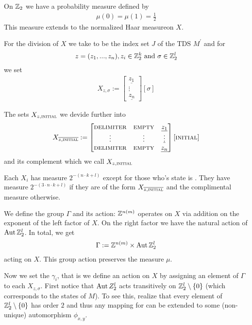On $\mathbb{Z}_2$ we have a probability measure defined by
\begin{align*}
	\mu(0) = \mu(1) = \frac12
\end{align*}
This measure extends to the normalized Haar measure\footnotemark on $X$.

For the division of $X$ we take  to be the index set $J$ of the TDS $M^\prime$ and for
\begin{align*}
	z = (z_1,...,z_n), z_i \in \mathbb{Z}_2^k ~\text{and}~\sigma \in \mathbb{Z}_2^l
\end{align*}
we set
\begin{align*}
	X_{z,\sigma} :=
	\begin{bmatrix}
		\underline{z_{1}} \\
		\vdots \\
		\underline{z_{n}}
	\end{bmatrix} [ \sigma ]
\end{align*}

The sets $X_{z,\text{\scshape{initial}}}$ we devide further into
\begin{align*}
	X_{\overline{z,\text{\scshape{initial}}}} :=
	\begin{bmatrix}
		\text{\scshape{delimiter}} & \text{\scshape{empty}} & \underline{z_1} \\
		\vdots & \vdots & \underline\vdots \\
		\text{\scshape{delimiter}} & \text{\scshape{empty}} & \underline{z_n} \\
	\end{bmatrix} [ \text{\scshape{initial}} ]
\end{align*}
and its complement which we call $X_{z,\text{\scshape{initial}}}$

\begin{Remark}
	Each $X_i$ has measure $2^{-(n \cdot k+l)}$ except for those who's state is \INI.
	They have measure $2^{-(3 \cdot n \cdot k+l)}$ if they are of the form $X_{\overline{z,\text{\scshape{initial}}}}$ and the complimental measure otherwise.
\end{Remark}

We define the group $\Gamma$ and its action:
$\mathbb{Z}^{n(m)}$ operates on $X$ via addition on the exponent of the left factor of $X$.
On the right factor we have the natural action of $\operatorname{Aut} \mathbb{Z}_2^l$.
In total, we get
\begin{align*}
	\Gamma := \mathbb{Z}^{n(m)} \times \operatorname{Aut} \mathbb{Z}_2^l
\end{align*}
acting on $X$.
This group action preserves the measure $\mu$.

Now we set the $\gamma_i$, that is we define an action on $X$ by assigning an element of $\Gamma$ to each $X_{z,\sigma}$.
First notice that
$\operatorname{Aut} Z_2^l$ acts transitively on $\mathbb{Z}_2^l \setminus \{0\}$ (which corresponds to the states of $M$).
To see this, realize that every element of $\mathbb{Z}_2^l \setminus \{0\}$ has order $2$ and thus any mapping  for  can be extended to some (non-unique) automorphism $\phi_{x,y}$.

